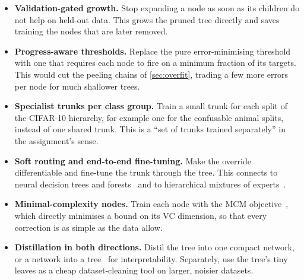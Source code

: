 \documentclass[10.5pt,a4paper]{article}
\begin{document}
\begin{itemize}
\item \textbf{Validation-gated growth.} Stop expanding a node as soon as its children do not help on held-out data.
This grows the pruned tree directly and saves training the nodes that are later removed.
\item \textbf{Progress-aware thresholds.} Replace the pure error-minimising threshold with one that requires each
node to fire on a minimum fraction of its targets. This would cut the peeling chains of \cref{sec:overfit}, trading a
few more errors per node for much shallower trees.
\item \textbf{Specialist trunks per class group.} Train a small trunk for each split of the CIFAR-10 hierarchy, for
example one for the confusable animal splits, instead of one shared trunk. This is a ``set of trunks trained
separately'' in the assignment's sense.
\item \textbf{Soft routing and end-to-end fine-tuning.} Make the override differentiable and fine-tune the trunk
through the tree. This connects to neural decision trees and forests~\cite{kontschieder2015deep,tanno2019adaptive}
and to hierarchical mixtures of experts~\cite{jordan1994hierarchical}.
\item \textbf{Minimal-complexity nodes.} Train each node with the MCM objective~\cite{jayadeva2015learning}, which
directly minimises a bound on its VC dimension, so that every correction is as simple as the data allow.
\item \textbf{Distillation in both directions.} Distil the tree into one compact network, or a network into a
tree~\cite{frosst2017distilling} for interpretability. Separately, use the tree's tiny leaves as a cheap
dataset-cleaning tool on larger, noisier datasets.
\end{itemize}

\small


\end{document}
